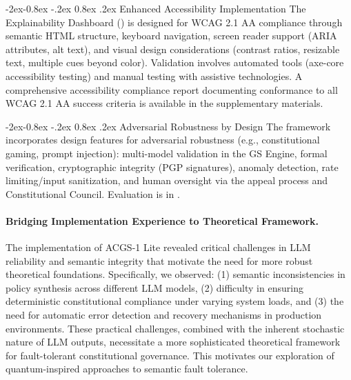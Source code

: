 \documentclass[manuscript,screen,9pt]{acmart}
\makeatletter
\renewcommand\subsubsection{\@startsection{subsubsection}{3}{\z@}%
  {-2ex\@plus -0.8ex \@minus -.2ex}%
  {0.8ex \@plus .2ex}%
  {\normalfont\normalsize\bfseries}}
\makeatother
\begin{document}
\begin{table}[!htb]
\subsubsection{Enhanced Accessibility Implementation}
\label{subsubsec:enhanced_accessibility}
The Explainability Dashboard () is designed for WCAG 2.1 AA compliance through semantic HTML structure, keyboard navigation, screen reader support (ARIA attributes, alt text), and visual design considerations (contrast ratios, resizable text, multiple cues beyond color). Validation involves automated tools (axe-core accessibility testing) and manual testing with assistive technologies. A comprehensive accessibility compliance report documenting conformance to all WCAG 2.1 AA success criteria is available in the supplementary materials.

\subsubsection{Adversarial Robustness by Design}
\label{subsubsec:adversarial_robustness_methods}
The framework incorporates design features for adversarial robustness (e.g., constitutional gaming, prompt injection): multi-model validation in the GS Engine, formal verification, cryptographic integrity (PGP signatures), anomaly detection, rate limiting/input sanitization, and human oversight via the appeal process and Constitutional Council. Evaluation is in .

\paragraph{Bridging Implementation Experience to Theoretical Framework.} The implementation of ACGS-1 Lite revealed critical challenges in LLM reliability and semantic integrity that motivate the need for more robust theoretical foundations. Specifically, we observed: (1) semantic inconsistencies in policy synthesis across different LLM models, (2) difficulty in ensuring deterministic constitutional compliance under varying system loads, and (3) the need for automatic error detection and recovery mechanisms in production environments. These practical challenges, combined with the inherent stochastic nature of LLM outputs, necessitate a more sophisticated theoretical framework for fault-tolerant constitutional governance. This motivates our exploration of quantum-inspired approaches to semantic fault tolerance.


\end{table}
\end{document}
